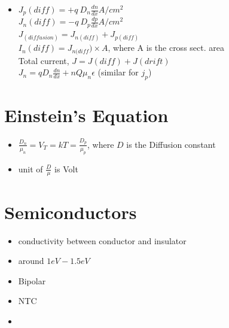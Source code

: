 \documentclass[10pt, a4paper]{report}
\begin{document}
\begin{itemize}
  	 	 \item $ J_p(diff) = +q\:D_n\frac{dn}{dx}  A/cm^2$\\$ J_n(diff) = -q\:D_p\frac{dp}{dx}  A/cm^2$ \\
  	 	 $ J_{(diffusion)} = J_{n(diff)} + J_{p(diff)} $ \\
  	 	 $ I_n(diff) = J_{n(diff}) \times A $, where A is the cross sect. area\\
  	 	 Total current, $ J = J(diff) + J(drift) $ \\
   	 	 $ J_n = qD_n\frac{dn}{dx} + nQ\mu_n \epsilon $ (similar for $ j_p $)
	\end{itemize}
	\section{Einstein's Equation}
	\begin{itemize}
		\item $ \frac{D_n}{\mu_n} = V_T = kT = \frac{D_p}{\mu_p} $, where $ D $ is the Diffusion constant
		\item unit of $\frac{D}{\mu}$ is Volt
	\end{itemize}
	\section{Semiconductors}
\begin{itemize}
	\item conductivity between conductor and insulator
	\item around $ 1eV-1.5eV $
	\item Bipolar
	\item NTC
	\item
\end{itemize}
\end{document}
